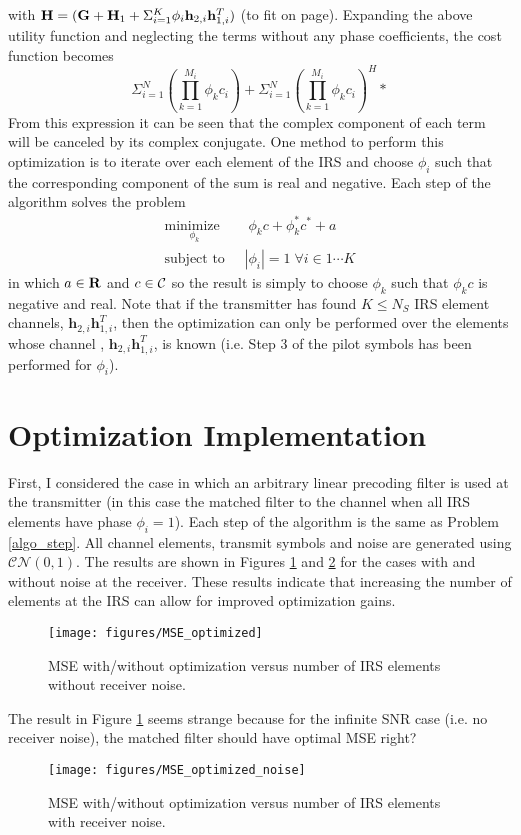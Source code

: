 \documentclass[12pt,a4paper]{report}
\begin{document}
	with $\mathbf{H} = (\mathbf{G} +  \mathbf{H}_1 + \Sigma_{i=1}^{K} \phi_i \mathbf{h}_{2,i}\mathbf{h}^T_{1,i})$ (to fit on page).
	Expanding the above utility function and neglecting the terms without any phase coefficients, the cost function becomes
	\begin{equation}
	\Sigma_{i=1}^{N} \left(\prod_{k=1}^{M_i}\phi_{k} c_i \right ) +  \Sigma_{i=1}^{N} \left(\prod_{k=1}^{M_i}\phi_{k} c_i \right)^H*
	\end{equation}
	From this expression it can be seen that the complex component of each term will be canceled by its complex conjugate.
	One method to perform this optimization is to iterate over each element of the IRS and choose $\phi_{i}$ such that 
	the corresponding component of the sum is real and negative. Each step of the algorithm solves the problem
	\begin{subequations}
	\label{algo_step}
	\begin{align}
	   	    \underset{\phi_k}{\text{minimize }}
	    & \; \phi_k c + \phi_k^* c^* + a 
	     \\
	    \text{subject to  } \; &
	    | \phi_i | = 1   \; \forall i \in {1 \cdots	 K}
	\end{align}
	\end{subequations}
	in which $a \in {\mbox{\bf R}}$ and $c \in \mathcal{C}$ so the result is simply to choose $\phi_k$ such that $\phi_k c$ is negative and real.
	Note that if the transmitter has found $K \leq N_S$ IRS element channels, $\mathbf{h}_{2,i}\mathbf{h}^T_{1,i}$, then the optimization can only be performed over
	the elements whose channel , $\mathbf{h}_{2,i}\mathbf{h}^T_{1,i}$, is known (i.e. Step 3 of the pilot symbols has been performed for $\phi_i$).

\section{Optimization Implementation}
	First, I considered the case in which an arbitrary linear precoding filter is used at the transmitter (in this case the matched filter to the channel when all IRS elements have phase $\phi_i = 1 $).
	Each step of the algorithm is the same as Problem \eqref{algo_step}.
	All channel elements, transmit symbols and noise are generated using $\mathcal{CN}(0,1)$.
	The results are shown in Figures \ref{MSE_opt} and \ref{MSE_opt_noise} for the cases with and without noise at the receiver. These results indicate that increasing the number of elements at the IRS can allow for improved optimization gains.
	\begin{figure}[H]
	\texttt{[image: figures/MSE\_optimized]}
	  \caption{MSE with/without optimization versus number of IRS elements without receiver noise.}
	  	  \label{MSE_opt}
	\end{figure}
		The result in Figure \ref{MSE_opt} seems  strange because for the infinite SNR case (i.e. no receiver noise), the matched filter should have optimal MSE right?
	\begin{figure}[H]
	\texttt{[image: figures/MSE\_optimized\_noise]}
	  \caption{MSE with/without optimization versus number of IRS elements with receiver noise.}
	  	  \label{MSE_opt_noise}
	\end{figure}
	
\end{document}
